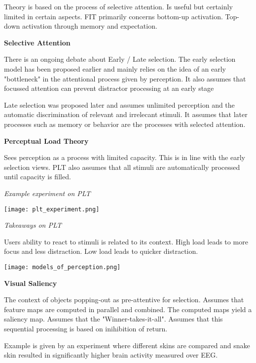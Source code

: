 Theory is based on the process of selective attention. Is useful but certainly limited in certain aspects. FIT primarily concerns bottom-up activation. Top-down activation through memory and expectation. \medskip

\textbf{Selective Attention} \smallskip

There is an ongoing debate about Early / Late selection. The early selection model has been proposed earlier and mainly relies on the idea of an early "bottleneck" in the attentional process given by perception. 
It also assumes that focussed attention can prevent distractor processing at an early stage\medskip

Late selection was proposed later and assumes unlimited perception and the automatic discrimination of relevant and irrelecant stimuli. 
It assumes that later processes such as memory or behavior are the processes with selected attention. \medskip

\textbf{Perceptual Load Theory} \smallskip

Sees perception as a process with limited capacity. This is in line with the early selection views. PLT also assumes that all stimuli are automatically processed until capacity is filled. \smallskip

\textit{Example experiment on PLT}
\begin{center}
	\texttt{[image: plt\_experiment.png]}
\end{center}

\textit{Takeaways on PLT}

Users ability to react to stimuli is related to its context. High load leads to more focus and less distraction. Low load leads to quicker distraction.\medskip

\begin{center}
	\texttt{[image: models\_of\_perception.png]}
\end{center}

\textbf{Visual Saliency} \smallskip

The context of objects popping-out as pre-attentive for selection. Assumes that feature maps are computed in parallel and combined. The computed maps yield a saliency map. Assumes that the "Winner-takes-it-all".
Assumes that this sequential processing is based on inihibition of return. \medskip

Example is given by an experiment where different skins are compared and snake skin resulted in significantly higher brain activity measured over EEG. \smallskip

